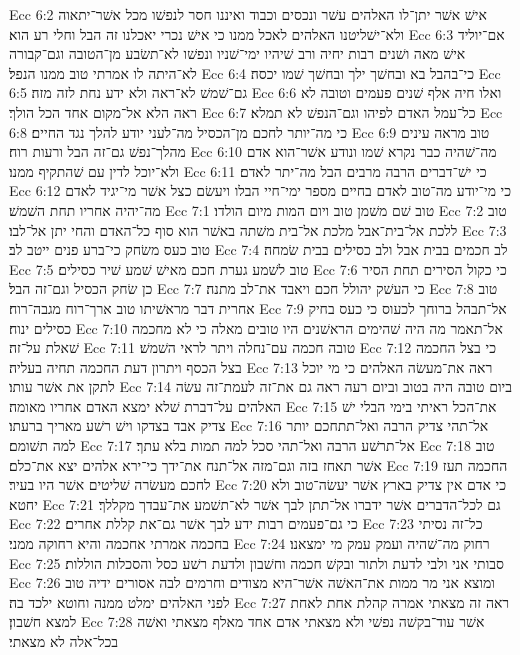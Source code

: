 Ecc 6:2  אישׁ אשׁר יתן־לו האלהים עשׁר ונכסים וכבוד ואיננו חסר לנפשׁו מכל אשׁר־יתאוה ולא־ישׁליטנו האלהים לאכל ממנו כי אישׁ נכרי יאכלנו זה הבל וחלי רע הוא׃
Ecc 6:3  אם־יוליד אישׁ מאה ושׁנים רבות יחיה ורב שׁיהיו ימי־שׁניו ונפשׁו לא־תשׂבע מן־הטובה וגם־קבורה לא־היתה לו אמרתי טוב ממנו הנפל׃
Ecc 6:4  כי־בהבל בא ובחשׁך ילך ובחשׁך שׁמו יכסה׃
Ecc 6:5  גם־שׁמשׁ לא־ראה ולא ידע נחת לזה מזה׃
Ecc 6:6  ואלו חיה אלף שׁנים פעמים וטובה לא ראה הלא אל־מקום אחד הכל הולך׃
Ecc 6:7  כל־עמל האדם לפיהו וגם־הנפשׁ לא תמלא׃
Ecc 6:8  כי מה־יותר לחכם מן־הכסיל מה־לעני יודע להלך נגד החיים׃
Ecc 6:9  טוב מראה עינים מהלך־נפשׁ גם־זה הבל ורעות רוח׃
Ecc 6:10  מה־שׁהיה כבר נקרא שׁמו ונודע אשׁר־הוא אדם ולא־יוכל לדין עם שׁהתקיף ממנו׃
Ecc 6:11  כי ישׁ־דברים הרבה מרבים הבל מה־יתר לאדם׃
Ecc 6:12  כי מי־יודע מה־טוב לאדם בחיים מספר ימי־חיי הבלו ויעשׂם כצל אשׁר מי־יגיד לאדם מה־יהיה אחריו תחת השׁמשׁ׃
Ecc 7:1  טוב שׁם משׁמן טוב ויום המות מיום הולדו׃
Ecc 7:2  טוב ללכת אל־בית־אבל מלכת אל־בית משׁתה באשׁר הוא סוף כל־האדם והחי יתן אל־לבו׃
Ecc 7:3  טוב כעס משׂחק כי־ברע פנים ייטב לב׃
Ecc 7:4  לב חכמים בבית אבל ולב כסילים בבית שׂמחה׃
Ecc 7:5  טוב לשׁמע גערת חכם מאישׁ שׁמע שׁיר כסילים׃
Ecc 7:6  כי כקול הסירים תחת הסיר כן שׂחק הכסיל וגם־זה הבל׃
Ecc 7:7  כי העשׁק יהולל חכם ויאבד את־לב מתנה׃
Ecc 7:8  טוב אחרית דבר מראשׁיתו טוב ארך־רוח מגבה־רוח׃
Ecc 7:9  אל־תבהל ברוחך לכעוס כי כעס בחיק כסילים ינוח׃
Ecc 7:10  אל־תאמר מה היה שׁהימים הראשׁנים היו טובים מאלה כי לא מחכמה שׁאלת על־זה׃
Ecc 7:11  טובה חכמה עם־נחלה ויתר לראי השׁמשׁ׃
Ecc 7:12  כי בצל החכמה בצל הכסף ויתרון דעת החכמה תחיה בעליה׃
Ecc 7:13  ראה את־מעשׂה האלהים כי מי יוכל לתקן את אשׁר עותו׃
Ecc 7:14  ביום טובה היה בטוב וביום רעה ראה גם את־זה לעמת־זה עשׂה האלהים על־דברת שׁלא ימצא האדם אחריו מאומה׃
Ecc 7:15  את־הכל ראיתי בימי הבלי ישׁ צדיק אבד בצדקו וישׁ רשׁע מאריך ברעתו׃
Ecc 7:16  אל־תהי צדיק הרבה ואל־תתחכם יותר למה תשׁומם׃
Ecc 7:17  אל־תרשׁע הרבה ואל־תהי סכל למה תמות בלא עתך׃
Ecc 7:18  טוב אשׁר תאחז בזה וגם־מזה אל־תנח את־ידך כי־ירא אלהים יצא את־כלם׃
Ecc 7:19  החכמה תעז לחכם מעשׂרה שׁליטים אשׁר היו בעיר׃
Ecc 7:20  כי אדם אין צדיק בארץ אשׁר יעשׂה־טוב ולא יחטא׃
Ecc 7:21  גם לכל־הדברים אשׁר ידברו אל־תתן לבך אשׁר לא־תשׁמע את־עבדך מקללך׃
Ecc 7:22  כי גם־פעמים רבות ידע לבך אשׁר גם־את קללת אחרים׃
Ecc 7:23  כל־זה נסיתי בחכמה אמרתי אחכמה והיא רחוקה ממני׃
Ecc 7:24  רחוק מה־שׁהיה ועמק עמק מי ימצאנו׃
Ecc 7:25  סבותי אני ולבי לדעת ולתור ובקשׁ חכמה וחשׁבון ולדעת רשׁע כסל והסכלות הוללות׃
Ecc 7:26  ומוצא אני מר ממות את־האשׁה אשׁר־היא מצודים וחרמים לבה אסורים ידיה טוב לפני האלהים ימלט ממנה וחוטא ילכד בה׃
Ecc 7:27  ראה זה מצאתי אמרה קהלת אחת לאחת למצא חשׁבון׃
Ecc 7:28  אשׁר עוד־בקשׁה נפשׁי ולא מצאתי אדם אחד מאלף מצאתי ואשׁה בכל־אלה לא מצאתי׃
